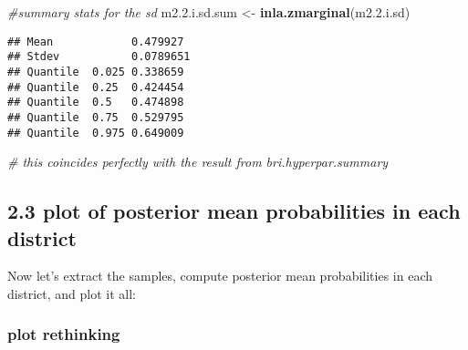 \documentclass[
]{article}
\newenvironment{Shaded}{\begin{snugshade}}{\end{snugshade}}
\newcommand{\CommentTok}[1]{\textcolor[rgb]{0.56,0.35,0.01}{\textit{#1}}}
\newcommand{\FloatTok}[1]{\textcolor[rgb]{0.00,0.00,0.81}{#1}}
\newcommand{\KeywordTok}[1]{\textcolor[rgb]{0.13,0.29,0.53}{\textbf{#1}}}
\newcommand{\NormalTok}[1]{#1}
\newcommand{\StringTok}[1]{\textcolor[rgb]{0.31,0.60,0.02}{#1}}
\begin{document}
\begin{Shaded}
\begin{Highlighting}[]
\CommentTok{#summary stats for the sd }
\NormalTok{m2.}\FloatTok{2.}\NormalTok{i.sd.sum <-}\StringTok{ }\KeywordTok{inla.zmarginal}\NormalTok{(m2.}\FloatTok{2.}\NormalTok{i.sd)}
\end{Highlighting}
\end{Shaded}

\begin{verbatim}
## Mean            0.479927 
## Stdev           0.0789651 
## Quantile  0.025 0.338659 
## Quantile  0.25  0.424454 
## Quantile  0.5   0.474898 
## Quantile  0.75  0.529795 
## Quantile  0.975 0.649009
\end{verbatim}

\begin{Shaded}
\begin{Highlighting}[]
\CommentTok{# this coincides perfectly with the result from bri.hyperpar.summary}
\end{Highlighting}
\end{Shaded}

\hypertarget{plot-of-posterior-mean-probabilities-in-each-district}{%
\subsection{2.3 plot of posterior mean probabilities in each
district}\label{plot-of-posterior-mean-probabilities-in-each-district}}

Now let's extract the samples, compute posterior mean probabilities in
each district, and plot it all:

\hypertarget{plot-rethinking}{%
\subsubsection{plot rethinking}\label{plot-rethinking}}
\end{document}
